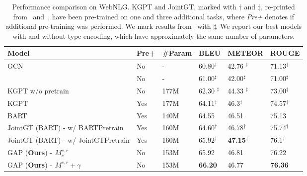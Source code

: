 \documentclass[11pt]{article}
\begin{document}
\begin{table*}[t]
\centering
\begin{tabular}{l|l|llll}
\hline
Model                                                           & Pre+ &\#Param & BLEU             & METEOR                    & ROUGE            \\ \hline
GCN~\cite{marcheggiani2018deep}                                                      & No & -      & 60.80$^\ddagger$  & 42.76 $^\ddagger$           & 71.13$^\ddagger$  \\ ~\citet{shimorina2018handling}                                                      & No & -      & 61.00$^\sharp$  & 42.00$^\sharp$           & 71.00$^\sharp$  \\ 

KGPT w/o pretrain & No                                                   & 177M      & 62.30 $^\ddagger$  & 44.33 $^\ddagger$           & 73.00$^\ddagger$  \\ 

KGPT & Yes                                                            & 177M   & 64.11$^\ddagger$ & 46.3$^\ddagger$           & 74.57$^\ddagger$ \\  
BART & Yes                                                            & 140M   & 64.55            & 46.51                     & 75.13            \\ 
JointGT (BART) - w/ BARTPretrain  & Yes                               & 160M   & 64.60$^{\dagger}$ & 46.78$^{\dagger}$          & 75.74$^{\dagger}$ \\ 
JointGT (BART) - w/ JointGTPretrain & Yes                         & 160M   & 65.92$^{\dagger}$ & \textbf{47.15}$^{\dagger}$ & 76.1$^{\dagger}$  \\ \hline
GAP (\textbf{Ours}) - $ {}^{}_{}M^{e,r}_{e} $   & No & 153M   & 65.92            & 46.81                     & 76.22            \\ 
GAP (\textbf{Ours}) - $ {}^{}_{}M^{e,r}_{} + \gamma$   & No & 153M   & \textbf{66.20}   & 46.77                     & \textbf{76.36}   \\ \hline
\end{tabular}
\caption{\label{tab:Main-WebNLG} Performance comparison on WebNLG. KGPT and JointGT, marked with $\dagger$ and $\ddagger$, re-printed from~\citet{chen-etal-2020-kgpt} and~\citet{ke-etal-2021-jointgt}, have been pre-trained on one and three additional tasks, where \textit{Pre+} denotes if additional pre-training was performed. We mark results from~\citet{shimorina2018handling} with $\sharp$. We report our best models with and without type encoding, which have approximately the same number of parameters.}
\end{table*}
\end{document}
